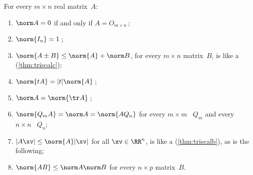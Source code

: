 \begin{theorem} \label{thm:norm} 
For every \(m\times n\) real matrix~\(A\):
\begin{enumerate}
\item\label{thm:norm:iii} \(\norm A=0\) if and only if \(A=O_{m\times n}\)\,;
\item\label{thm:norm:vi} \(\norm{I_n}=1\)\,;
\item\label{thm:norm:iv} \(\norm {A\pm B}\leq\norm{A}+\norm B\), for every \(m\times n\) matrix~\(B\), is like a  (\autoref{thm:triscalc});
\item\label{thm:norm:v} \(\norm{tA}=|t|\norm{A}\)\,;
\item\label{thm:norm:i} \(\norm A=\norm{\tr A}\)\,;
\item\label{thm:norm:ii} \(\norm{Q_mA}=\norm A=\norm{AQ_n}\) for every \(m\times m\) ~\(Q_m\) and every \(n\times n\) ~\(Q_n\);
\item\label{thm:norm:viii} \(|A\xv|\leq\norm{A}|\xv|\) for all \(\xv\in\RR^n\), is like a  (\autoref{thm:triscalb}), as is the following;
\item\label{thm:norm:vii} \(\norm{AB}\leq\norm A\norm B\) for every \(n\times p\) matrix~\(B\).
\end{enumerate}
\end{theorem}
